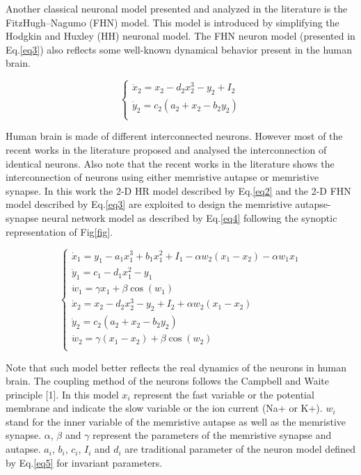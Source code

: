 \documentclass[journal]{IEEEtran/IEEEtran}
\begin{document}
Another classical neuronal model presented and analyzed in the literature is the FitzHugh–Nagumo (FHN) model. This model is introduced by simplifying the Hodgkin and Huxley (HH) neuronal model. The FHN neuron model (presented in Eq.\ref{eq3}) also reflects some well-known dynamical behavior present in the human brain.

\begin{equation}\label{eq3}
\left\{ \begin{array}{l}
 {{\dot x}_2} = {x_2} - {d_2}x_2^3 - {y_2} + {I_2} \\ 
 {{\dot y}_2} = {c_2}({a_2} + {x_2} - {b_2}{y_2}) \\ 
 \end{array} \right.
\end{equation}

Human brain is made of different interconnected neurons. However most of the recent works in the literature proposed and analysed the interconnection of identical neurons. Also note that the recent works in the literature shows the interconnection of neurons using either memristive autapse or memristive synapse. In this work the 2-D HR model described by Eq.\ref{eq2} and the 2-D FHN model described by Eq.\ref{eq3} are exploited to design the memristive autapse-synapse neural network model as described by Eq.\ref{eq4} following the synoptic representation of Fig\ref{fig}. 

\begin{equation}\label{eq4}
\left\{ \begin{array}{l}
 {{\dot x}_1} = {y_1} - {a_1}x_1^3 + {b_1}x_1^2 + {I_1} - \alpha {w_2}({x_1} - {x_2}) - \alpha {w_1}{x_1} \\ 
 {{\dot y}_1} = {c_1} - {d_1}x_1^2 - {y_1} \\ 
 {{\dot w}_1} = \gamma {x_1} + \beta \cos ({w_1}) \\ 
 {{\dot x}_2} = {x_2} - {d_2}x_2^3 - {y_2} + {I_2} + \alpha {w_2}({x_1} - {x_2}) \\ 
 {{\dot y}_2} = {c_2}({a_2} + {x_2} - {b_2}{y_2}) \\ 
 {{\dot w}_2} = \gamma ({x_1} - {x_2}) + \beta \cos ({w_2}) \\ 
 \end{array} \right.
\end{equation}

Note that such model better reflects the real dynamics of the neurons in human brain. The coupling method of the neurons follows the Campbell and Waite principle [1]. In this model ${x_i}$  represent the fast variable or the potential membrane and   indicate the slow variable or the ion current (Na+ or K+). ${w_i}$  stand for the inner variable of the memristive autapse as well as the memristive synapse.  $\alpha $, $\beta$  and $\gamma $  represent the parameters of the memristive synapse and autapse.  ${a_i}$,  ${b_i}$,  ${c_i}$, ${I_i}$  and ${d_i}$  are traditional parameter of the neuron model defined by Eq.\ref{eq5} for invariant parameters.
\end{document}
